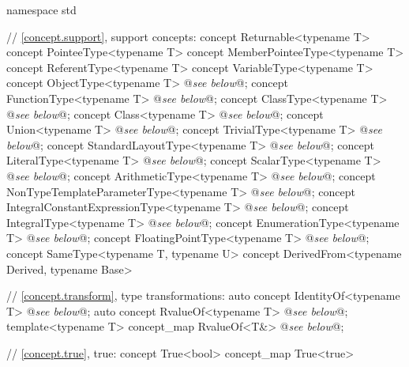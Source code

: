 \documentclass[american,twoside]{book}
\begin{document}
\begin{codeblock}
namespace std {
  // \ref{concept.support}, support concepts:
  concept Returnable<typename T> { }
  concept PointeeType<typename T> { }
  concept MemberPointeeType<typename T> { }
  concept ReferentType<typename T> { }
  concept VariableType<typename T> { }
  concept ObjectType<typename T> @\textit{see below}@;
  concept FunctionType<typename T> @\textit{see below}@;
  concept ClassType<typename T> @\textit{see below}@;
  concept Class<typename T> @\textit{see below}@;
  concept Union<typename T> @\textit{see below}@;
  concept TrivialType<typename T> @\textit{see below}@;
  concept StandardLayoutType<typename T> @\textit{see below}@;
  concept LiteralType<typename T> @\textit{see below}@;
  concept ScalarType<typename T> @\textit{see below}@;
  concept ArithmeticType<typename T> @\textit{see below}@;
  concept NonTypeTemplateParameterType<typename T> @\textit{see below}@;
  concept IntegralConstantExpressionType<typename T> @\textit{see below}@;
  concept IntegralType<typename T> @\textit{see below}@;
  concept EnumerationType<typename T> @\textit{see below}@;
  concept FloatingPointType<typename T> @\textit{see below}@;
  concept SameType<typename T, typename U> {  }
  concept DerivedFrom<typename Derived, typename Base> { }

  // \ref{concept.transform}, type transformations:
  auto concept IdentityOf<typename T> @\textit{see below}@;
  auto concept RvalueOf<typename T> @\textit{see below}@;
  template<typename T> concept_map RvalueOf<T&> @\textit{see below}@;

  // \ref{concept.true}, true:
  concept True<bool> { }
  concept_map True<true> { }

}
\end{codeblock}
\end{document}

